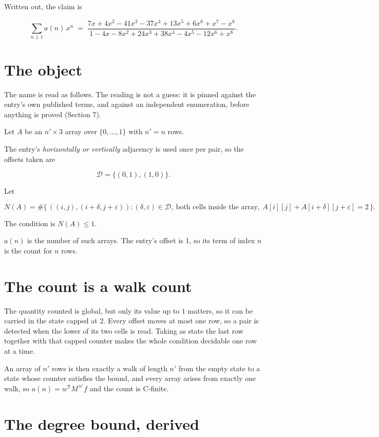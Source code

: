 \documentclass[11pt]{article}
\theoremstyle{definition}
\begin{document}
Written out, the claim is

\[\sum_{n \ge 1} a(n)\,x^n \;=\; \frac{7x + 4x^{2} - 41x^{3} - 37x^{4} + 13x^{5} + 6x^{6} + x^{7} - x^{8}}{1 - 4x - 8x^{2} + 24x^{3} + 38x^{4} - 4x^{5} - 12x^{6} + x^{8}}.\]

\section{The object}

The name is read as follows. The reading is not a guess: it is pinned against the entry's own published terms, and against an independent enumeration, before anything is proved (Section 7).

Let $A$ be an $n' \times 3$ array over $\{0,\dots,1\}$ with $n' = n$ rows.

The entry's {\itshape horizontally or vertically} adjacency is used once per pair, so the offsets taken are

\[\mathcal{D} = \{(0,1), (1,0)\}.\]

Let

\[N(A) = \#\bigl\{\,((i,j),(i{+}\delta,j{+}\varepsilon)) : (\delta,\varepsilon) \in \mathcal{D},\ \text{both cells inside the array},\ A[i][j] + A[i{+}\delta][j{+}\varepsilon] = 2\,\bigr\}.\]

The condition is $N(A) \le 1$.

$a(n)$ is the number of such arrays. The entry's offset is 1, so its term of index $n$ is the count for $n$ rows.

\section{The count is a walk count}

The quantity counted is global, but only its value up to $1$ matters, so it can be carried in the state capped at $2$. Every offset moves at most one row, so a pair is detected when the lower of its two cells is read. Taking as state the last row together with that capped counter makes the whole condition decidable one row at a time.

An array of $n'$ rows is then exactly a walk of length $n'$ from the empty state to a state whose counter satisfies the bound, and every array arises from exactly one walk, so $a(n) = w^{\mathsf T}M^{\,n'}f$ and the count is C-finite.

\section{The degree bound, derived}
\end{document}
